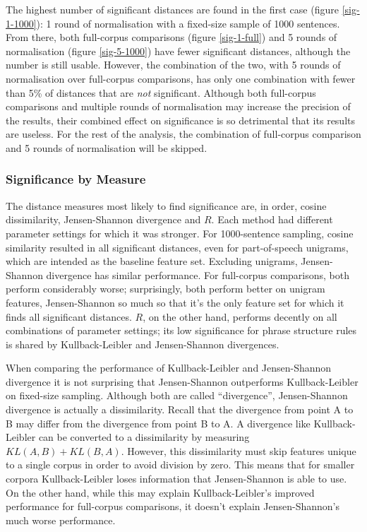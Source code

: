 The highest number of significant distances are found in the first
case (figure \ref{sig-1-1000}): 1 round of normalisation with a
fixed-size sample of 1000 sentences. From there, both full-corpus
comparisons (figure \ref{sig-1-full}) and 5 rounds of normalisation
(figure \ref{sig-5-1000}) have fewer significant distances, although
the number is still usable. However, the combination of the two, with
5 rounds of normalisation over full-corpus comparisons, has only one
combination with fewer than 5\% of distances that are {\it not}
significant. Although both full-corpus comparisons and multiple rounds
of normalisation may increase the precision of the results, their
combined effect on significance is so detrimental that its results are
useless. For the rest of the analysis, the combination of full-corpus
comparison and 5 rounds of normalisation will be skipped.

\subsubsection{Significance by Measure}

The distance measures most likely to find significance are, in order,
cosine dissimilarity, Jensen-Shannon divergence and $R$. Each method
had different parameter settings for which it was stronger. For
1000-sentence sampling, cosine similarity resulted in all significant
distances, even for part-of-speech unigrams, which are intended as the
baseline feature set. Excluding unigrams, Jensen-Shannon divergence
has similar performance. For full-corpus comparisons, both perform
considerably worse; surprisingly, both perform better on unigram
features, Jensen-Shannon so much so that it's the only feature set for
which it finds all significant distances. $R$, on the other hand,
performs decently on all combinations of parameter settings; its low
significance for phrase structure rules is shared by Kullback-Leibler
and Jensen-Shannon divergences.

When comparing the performance of Kullback-Leibler and Jensen-Shannon
divergence it is not surprising that Jensen-Shannon outperforms
Kullback-Leibler on fixed-size sampling. Although both are called
``divergence'', Jensen-Shannon divergence is actually a
dissimilarity. Recall that the divergence from point A to B may differ
from the divergence from point B to A. A divergence like
Kullback-Leibler can be converted to a dissimilarity by measuring
$KL(A,B) + KL(B,A)$. However, this dissimilarity must skip features
unique to a single corpus in order to avoid division by zero. This
means that for smaller corpora Kullback-Leibler loses information that
Jensen-Shannon is able to use.  On the other hand, while this may
explain Kullback-Leibler's improved performance for full-corpus
comparisons, it doesn't explain Jensen-Shannon's much worse
performance.

